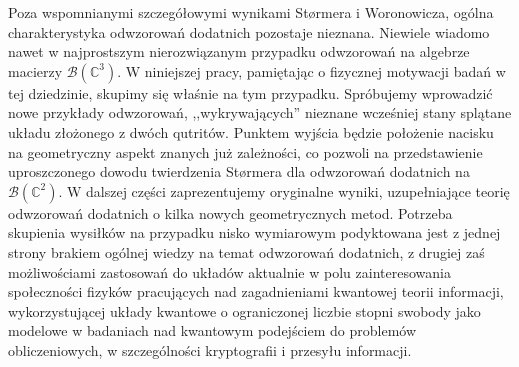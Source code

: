 Poza wspomnianymi szczegółowymi wynikami St{\o}rmera i Woronowicza,
ogólna charakterystyka odwzorowań dodatnich pozostaje nieznana.
Niewiele wiadomo nawet w najprostszym nierozwiązanym przypadku odwzorowań
na algebrze macierzy $\mathcal{B}(\mathbb{C}^{3})$.
W niniejszej pracy,
pamiętając o fizycznej motywacji badań w tej dziedzinie,
skupimy się właśnie na tym przypadku.
Spróbujemy wprowadzić nowe przykłady odwzorowań,
,,wykrywających'' nieznane wcześniej stany splątane układu złożonego
z dwóch qutritów.
Punktem wyjścia będzie położenie nacisku na geometryczny aspekt znanych
już zależności,
co pozwoli na przedstawienie uproszczonego dowodu twierdzenia St{\o}rmera
dla odwzorowań dodatnich na $\mathcal{B}(\mathbb{C}^{2})$.
W dalszej części zaprezentujemy oryginalne wyniki,
uzupełniające teorię odwzorowań dodatnich o kilka nowych geometrycznych metod.
Potrzeba skupienia wysiłków na przypadku nisko wymiarowym podyktowana jest
z jednej strony brakiem ogólnej wiedzy na temat odwzorowań dodatnich,
z drugiej zaś możliwościami zastosowań do układów aktualnie w polu zainteresowania
społeczności fizyków pracujących nad zagadnieniami kwantowej teorii informacji,
wykorzystującej układy kwantowe o ograniczonej liczbie stopni swobody
jako modelowe w badaniach nad kwantowym podejściem do problemów obliczeniowych,
w szczególności kryptografii i przesyłu informacji.

